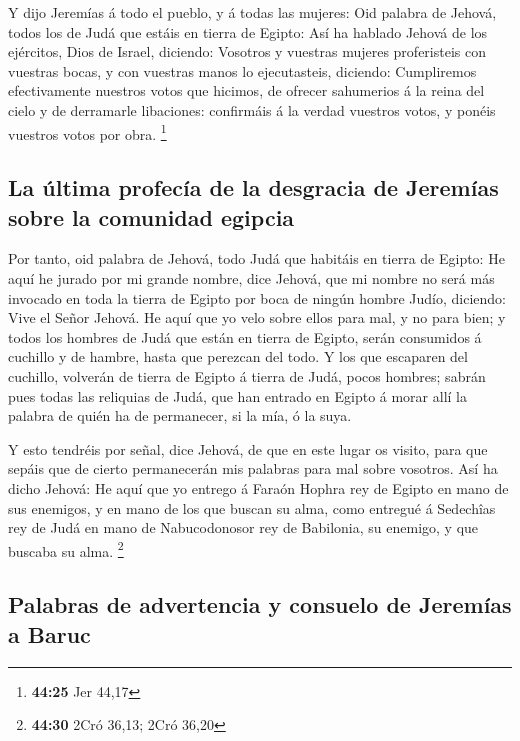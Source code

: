  Y dijo Jeremías á todo el pueblo, y á todas las mujeres:
Oid palabra de Jehová, todos los de Judá que estáis en tierra de Egipto:
 Así ha hablado Jehová de los ejércitos, Dios de Israel,
diciendo: Vosotros y vuestras mujeres proferisteis con vuestras bocas, y
con vuestras manos lo ejecutasteis, diciendo: Cumpliremos efectivamente
nuestros votos que hicimos, de ofrecer sahumerios á la reina del cielo y
de derramarle libaciones: confirmáis á la verdad vuestros votos, y
ponéis vuestros votos por obra. \footnote{\textbf{44:25} Jer 44,17}

\hypertarget{la-uxfaltima-profecuxeda-de-la-desgracia-de-jeremuxedas-sobre-la-comunidad-egipcia}{%
\subsection{La última profecía de la desgracia de Jeremías sobre la
comunidad
egipcia}\label{la-uxfaltima-profecuxeda-de-la-desgracia-de-jeremuxedas-sobre-la-comunidad-egipcia}}

 Por tanto, oid palabra de Jehová, todo Judá que habitáis
en tierra de Egipto: He aquí he jurado por mi grande nombre, dice
Jehová, que mi nombre no será más invocado en toda la tierra de Egipto
por boca de ningún hombre Judío, diciendo: Vive el Señor Jehová.
 He aquí que yo velo sobre ellos para mal, y no para bien;
y todos los hombres de Judá que están en tierra de Egipto, serán
consumidos á cuchillo y de hambre, hasta que perezcan del todo.
 Y los que escaparen del cuchillo, volverán de tierra de
Egipto á tierra de Judá, pocos hombres; sabrán pues todas las reliquias
de Judá, que han entrado en Egipto á morar allí la palabra de quién ha
de permanecer, si la mía, ó la suya.

 Y esto tendréis por señal, dice Jehová, de que en este
lugar os visito, para que sepáis que de cierto permanecerán mis palabras
para mal sobre vosotros.  Así ha dicho Jehová: He aquí que
yo entrego á Faraón Hophra rey de Egipto en mano de sus enemigos, y en
mano de los que buscan su alma, como entregué á Sedechîas rey de Judá en
mano de Nabucodonosor rey de Babilonia, su enemigo, y que buscaba su
alma. \footnote{\textbf{44:30} 2Cró 36,13; 2Cró 36,20}

\hypertarget{palabras-de-advertencia-y-consuelo-de-jeremuxedas-a-baruc}{%
\subsection{Palabras de advertencia y consuelo de Jeremías a
Baruc}\label{palabras-de-advertencia-y-consuelo-de-jeremuxedas-a-baruc}}

